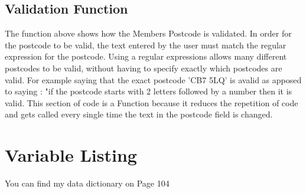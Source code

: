 \subsection{Validation Function}
\begin{figure}[H]
\end{figure}

The function above shows how the Members Postcode is validated. In order for the postcode to be valid, the text entered by the user must match the regular expression for the postcode. Using a regular expressions allows many different postcodes to be valid, without having to specify exactly which postcodes are valid. For example saying that the exact postcode 'CB7 5LQ' is avalid as apposed to saying : "if the postcode starts with 2 letters followed by a number then it is valid. This section of code is a Function because it reduces the repetition of code and gets called every single time the text in the postcode field is changed. 

\pagebreak

\section{Variable Listing}

You can find my data dictionary on Page 104 

